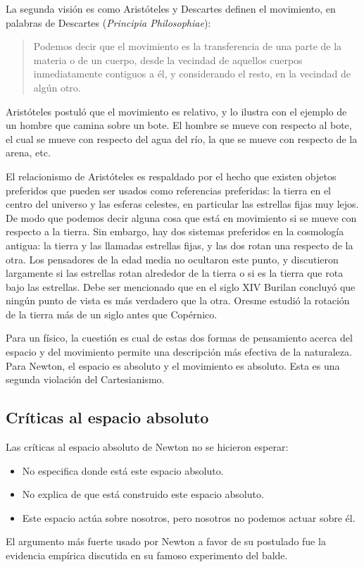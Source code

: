 \documentclass[../apunte_mecanica_clasica.tex]{subfiles}%
\begin{document}
La segunda visión es como Aristóteles y Descartes definen el movimiento, en palabras de Descartes (\emph{Principia Philosophiae}):
\begin{quote}
Podemos decir que el movimiento es la transferencia de una parte de la materia o de un cuerpo, desde la vecindad de aquellos cuerpos inmediatamente contiguos a él, y considerando el resto, en la vecindad de algún otro.
\end{quote}

Aristóteles postuló que el movimiento es relativo, y lo ilustra con el ejemplo de un hombre que camina sobre un bote. El hombre se mueve con respecto al bote, el cual se mueve con respecto del agua del río, la que se mueve con respecto de la arena, etc.

El relacionismo de Aristóteles es respaldado por el hecho que existen objetos preferidos que pueden ser usados como referencias preferidas: la tierra en el centro del universo y las esferas celestes, en particular las estrellas fijas muy lejos. De modo que podemos decir alguna cosa que está en movimiento si se mueve con respecto a la tierra. Sin embargo, hay dos sistemas preferidos en la cosmología antigua: la tierra y las llamadas estrellas fijas, y las dos rotan una respecto de la otra. Los pensadores de la edad media no ocultaron este punto, y discutieron largamente si las estrellas rotan alrededor de la tierra o si es la tierra que rota bajo las estrellas. Debe ser mencionado que en el siglo XIV Burilan concluyó que ningún punto de vista es más verdadero que la otra. Oresme estudió la rotación de la tierra más de un siglo antes que Copérnico.

Para un físico, la cuestión es cual de estas dos formas de pensamiento acerca del espacio y del movimiento permite una descripción más efectiva de la naturaleza. Para Newton, el espacio es absoluto y el movimiento es absoluto. Esta es una segunda violación del Cartesianismo.

\subsection{Críticas al espacio absoluto}

Las críticas al espacio absoluto de Newton no se hicieron esperar:
\begin{itemize}
    \item No especifica donde está este espacio absoluto.
    \item No explica de que está construido este espacio absoluto.
    \item Este espacio actúa sobre nosotros, pero nosotros no podemos actuar sobre él.
\end{itemize}
El argumento más fuerte usado por Newton a favor de su postulado fue la evidencia empírica discutida en su famoso experimento del balde.
\end{document}
